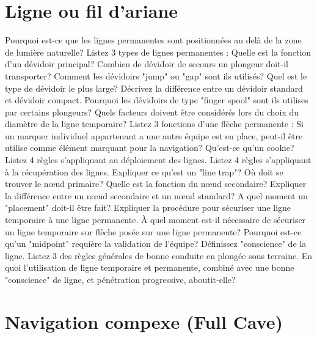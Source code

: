 \documentclass[english,10pt,a4paper]{article}
\begin{document}
	\section{Ligne ou fil d'ariane}

	\begin{outline}
		\1 Pourquoi est-ce que les lignes permanentes sont positionnées au delà de la zone de lumière naturelle?
		\1 Listez 3 types de lignes permanentes :
		\1 Quelle est la fonction d’un dévidoir principal?
		\1 Combien de dévidoir de secours un plongeur doit-il transporter?
		\1 Comment les dévidoirs "jump" ou "gap" sont ils utilisés?
		\1 Quel est le type de dévidoir le plus large?
		\1 Décrivez la différence entre un dévidoir standard et dévidoir compact.
		\1 Pourquoi les dévidoirs de type "finger spool" sont ils utilises par certains plongeurs?
		\1 Quels facteurs doivent être considérés lors du choix du diamètre de la ligne temporaire?
		\1 Listez 3 fonctions d’une flèche permanente :
		\1 Si un marquer individuel appartenant a une autre équipe est en place, peut-il être utilise comme élément marquant pour la navigation?
		\1 Qu’est-ce qu’un cookie?
		\1 Listez 4 règles s’appliquant au déploiement des lignes.
		\1 Listez 4 règles s’appliquant à la récupération des lignes.
		\1 Expliquer ce qu’est un "line trap"?
		\1 Où doit se trouver le nœud primaire?
		\1 Quelle est la fonction du nœud secondaire?
		\1 Expliquer la différence entre un nœud secondaire et un nœud standard?
		\1 A quel moment un "placement" doit-il être fait?
		\1 Expliquer la procédure pour sécuriser une ligne temporaire à une ligne permanente.
		\1 À quel moment est-il nécessaire de sécuriser un ligne temporaire sur flèche posée sur une ligne permanente?
		\1 Pourquoi est-ce qu’un "midpoint" requière la validation de l’équipe?
		\1 Définissez "conscience" de la ligne.
		\1 Listez 3 des règles générales de bonne conduite en plongée sous terraine.
		\1 En quoi l’utilisation de ligne temporaire et permanente, combiné avec une bonne "conscience" de ligne, et pénétration progressive, aboutit-elle?
	\end{outline}
	\sectionpage

	\section{Navigation compexe (Full Cave)}
\end{document}
